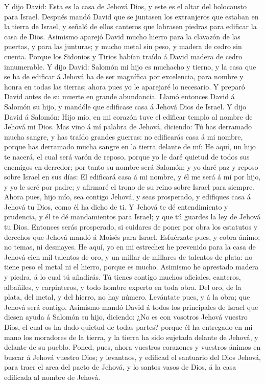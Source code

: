  Y dijo David: Esta es la casa de Jehová Dios, y este es
el altar del holocausto para Israel.  Después mandó David
que se juntasen los extranjeros que estaban en la tierra de Israel, y
señaló de ellos canteros que labrasen piedras para edificar la casa de
Dios.  Asimismo aparejó David mucho hierro para la
clavazón de las puertas, y para las junturas; y mucho metal sin peso, y
madera de cedro sin cuenta.  Porque los Sidonios y Tirios
habían traído á David madera de cedro innumerable.  Y dijo
David: Salomón mi hijo es muchacho y tierno, y la casa que se ha de
edificar á Jehová ha de ser magnífica por excelencia, para nombre y
honra en todas las tierras; ahora pues yo le aparejaré lo necesario. Y
preparó David antes de su muerte en grande abundancia. 
Llamó entonces David á Salomón su hijo, y mandóle que edificase casa á
Jehová Dios de Israel.  Y dijo David á Salomón: Hijo mío,
en mi corazón tuve el edificar templo al nombre de Jehová mi Dios.
 Mas vino á mí palabra de Jehová, diciendo: Tú has
derramado mucha sangre, y has traído grandes guerras: no edificarás casa
á mi nombre, porque has derramado mucha sangre en la tierra delante de
mí:  He aquí, un hijo te nacerá, el cual será varón de
reposo, porque yo le daré quietud de todos sus enemigos en derredor; por
tanto su nombre será Salomón; y yo daré paz y reposo sobre Israel en sus
días:  El edificará casa á mi nombre, y él me será á mí
por hijo, y yo le seré por padre; y afirmaré el trono de su reino sobre
Israel para siempre.  Ahora pues, hijo mío, sea contigo
Jehová, y seas prosperado, y edifiques casa á Jehová tu Dios, como él ha
dicho de ti.  Y Jehová te dé entendimiento y prudencia, y
él te dé mandamientos para Israel; y que tú guardes la ley de Jehová tu
Dios.  Entonces serás prosperado, si cuidares de poner
por obra los estatutos y derechos que Jehová mandó á Moisés para Israel.
Esfuérzate pues, y cobra ánimo; no temas, ni desmayes. 
He aquí, yo en mi estrechez he prevenido para la casa de Jehová cien mil
talentos de oro, y un millar de millares de talentos de plata: no tiene
peso el metal ni el hierro, porque es mucho. Asimismo he aprestado
madera y piedra, á lo cual tú añadirás.  Tú tienes
contigo muchos oficiales, canteros, albañiles, y carpinteros, y todo
hombre experto en toda obra.  Del oro, de la plata, del
metal, y del hierro, no hay número. Levántate pues, y á la obra; que
Jehová será contigo.  Asimismo mandó David á todos los
principales de Israel que diesen ayuda á Salomón su hijo, diciendo:
 ¿No es con vosotros Jehová vuestro Dios, el cual os ha
dado quietud de todas partes? porque él ha entregado en mi mano los
moradores de la tierra, y la tierra ha sido sujetada delante de Jehová,
y delante de su pueblo.  Poned, pues, ahora vuestros
corazones y vuestros ánimos en buscar á Jehová vuestro Dios; y
levantaos, y edificad el santuario del Dios Jehová, para traer el arca
del pacto de Jehová, y lo santos vasos de Dios, á la casa edificada al
nombre de Jehová.

